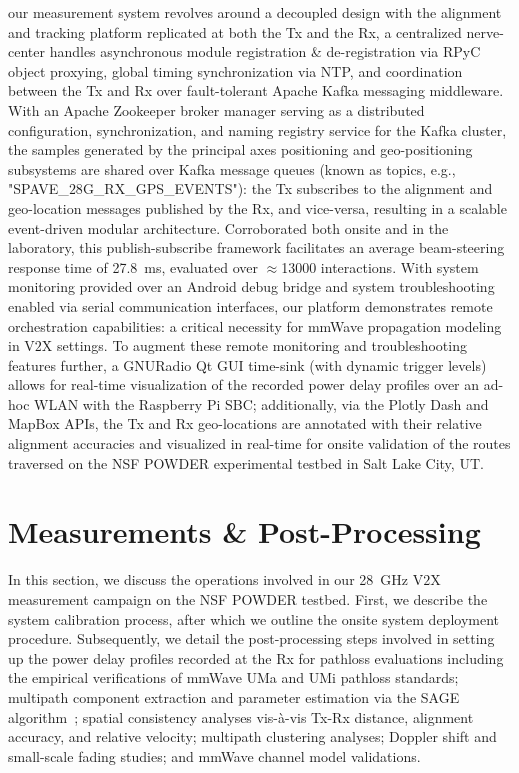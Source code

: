 \documentclass[12pt, draftcls, onecolumn]{IEEEtran}
\begin{document}
 our measurement system revolves around a decoupled design with the alignment and tracking platform replicated at both the Tx and the Rx, a centralized nerve-center handles asynchronous module registration \& de-registration via RPyC object proxying, global timing synchronization via NTP, and coordination between the Tx and Rx over fault-tolerant Apache Kafka messaging middleware. With an Apache Zookeeper broker manager serving as a distributed configuration, synchronization, and naming registry service for the Kafka cluster, the samples generated by the principal axes positioning and geo-positioning subsystems are shared over Kafka message queues (known as topics, e.g., "SPAVE\_$28$G\_RX\_GPS\_EVENTS"): the Tx subscribes to the alignment and geo-location messages published by the Rx, and vice-versa, resulting in a scalable event-driven modular architecture. Corroborated both onsite and in the laboratory, this publish-subscribe framework facilitates an average beam-steering response time of \SI{27.8}{\milli\second}, evaluated over ${\approx}$\SI{13000}{} interactions. With system monitoring provided over an Android debug bridge and system troubleshooting enabled via serial communication interfaces, our platform demonstrates remote orchestration capabilities: a critical necessity for mmWave propagation modeling in V$2$X settings. To augment these remote monitoring and troubleshooting features further, a GNURadio Qt GUI time-sink (with dynamic trigger levels) allows for real-time visualization of the recorded power delay profiles over an ad-hoc WLAN with the Raspberry Pi SBC; additionally, via the Plotly Dash and MapBox APIs, the Tx and Rx geo-locations are annotated with their relative alignment accuracies and visualized in real-time for onsite validation of the routes traversed on the NSF POWDER experimental testbed in Salt Lake City, UT.
\vspace{-3mm}

\section{Measurements \& Post-Processing}\label{S3}
In this section, we discuss the operations involved in our \SI{28}{\giga\hertz} V$2$X measurement campaign on the NSF POWDER testbed. First, we describe the system calibration process, after which we outline the onsite system deployment procedure. Subsequently, we detail the post-processing steps involved in setting up the power delay profiles recorded at the Rx for pathloss evaluations including the empirical verifications of mmWave UMa and UMi pathloss standards; multipath component extraction and parameter estimation via the SAGE algorithm~\cite{SAGE}; spatial consistency analyses vis-\`{a}-vis Tx-Rx distance, alignment accuracy, and relative velocity; multipath clustering analyses; Doppler shift and small-scale fading studies; and mmWave channel model validations.
\end{document}
